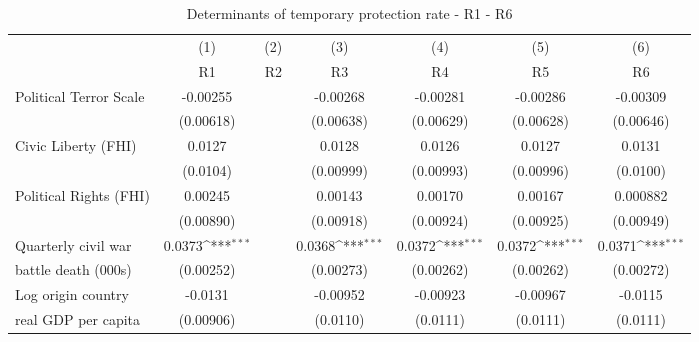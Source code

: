 \begin{table}[!ht]\centering \scriptsize
\def\sym#1{\ifmmode^{#1}\else\(^{#1}\)\fi}
\caption{Determinants of temporary protection rate - R1 - R6}
\begin{tabular}{l*{6}{c}}
\hline\hline
	&\multicolumn{1}{c}{(1)}     &\multicolumn{1}{c}{(2)}       &\multicolumn{1}{c}{(3)}       &\multicolumn{1}{c}{(4)}    	&\multicolumn{1}{c}{(5)}  	&\multicolumn{1}{c}{(6)}   \\
                   &\multicolumn{1}{c}{R1}&\multicolumn{1}{c}{R2}&\multicolumn{1}{c}{R3}&\multicolumn{1}{c}{R4}&\multicolumn{1}{c}{R5}&\multicolumn{1}{c}{R6}\\
\hline
Political Terror Scale&    -0.00255         &                     &    -0.00268         &    -0.00281         &    -0.00286         &    -0.00309         \\
                    &   (0.00618)         &                     &   (0.00638)         &   (0.00629)         &   (0.00628)         &   (0.00646)         \\
[0,5em]
Civic Liberty (FHI) &      0.0127         &                     &      0.0128         &      0.0126         &      0.0127         &      0.0131         \\
                    &    (0.0104)         &                     &   (0.00999)         &   (0.00993)         &   (0.00996)         &    (0.0100)         \\
[0,5em]
Political Rights (FHI)&     0.00245         &                     &     0.00143         &     0.00170         &     0.00167         &    0.000882         \\
                    &   (0.00890)         &                     &   (0.00918)         &   (0.00924)         &   (0.00925)         &   (0.00949)         \\
[0,5em]
Quarterly civil war&      0.0373\sym{***}&                     &      0.0368\sym{***}&      0.0372\sym{***}&      0.0372\sym{***}&      0.0371\sym{***}\\
 battle death (000s)                    &   (0.00252)         &                     &   (0.00273)         &   (0.00262)         &   (0.00262)         &   (0.00272)         \\
[0,5em]
Log origin country &     -0.0131         &                     &    -0.00952         &    -0.00923         &    -0.00967         &     -0.0115         \\
real GDP per capita                    &   (0.00906)         &                     &    (0.0110)         &    (0.0111)         &    (0.0111)         &    (0.0111)         \\

\end{tabular}
\end{table}
